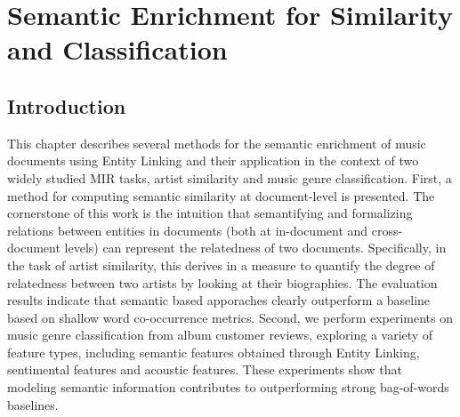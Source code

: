 

\chapter[Semantic Enrichment for Similarity and Classification][Semantic Enrichment for Sim. and Classif.]{Semantic Enrichment for Similarity and Classification}
\label{sec:similarity}

\section{Introduction}\label{sec:similarity:introduction} %

This chapter describes several methods for the semantic enrichment of music documents using Entity Linking and their application in the context of two widely studied MIR tasks, artist similarity and music genre classification. 
First, a method for computing semantic similarity at document-level is presented. The cornerstone of this work is the intuition that semantifying and formalizing relations between entities in documents (both at in-document and cross-document levels) can represent the relatedness of two documents. Specifically, in the task of artist similarity, this derives in a measure to quantify the degree of relatedness between two artists by looking at their biographies. The evaluation results indicate that semantic based apporaches clearly outperform a baseline based on shallow word co-occurrence metrics.
Second, we perform experiments on music genre classification from album customer reviews, exploring a variety of feature types, including semantic features obtained through Entity Linking, sentimental features  and acoustic features. These experiments show that modeling semantic information contributes to outperforming strong bag-of-words baselines. 

